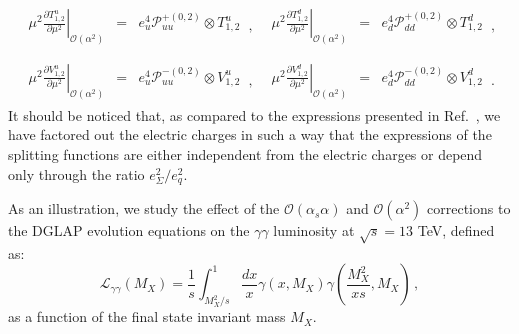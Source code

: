 \begin{equation}
\begin{array}{ll}
\begin{array}{rcl}
\displaystyle \left.\mu^2\frac{\partial T^u_{1,2}}{\partial \mu^2}\right|_{\mathcal{O}(\alpha^2)} &=&
\displaystyle e_u^4\mathcal{P}_{uu}^{+(0,2)}\otimes T^u_{1,2}
\end{array}\,, &
\begin{array}{rcl}
\displaystyle \left.\mu^2\frac{\partial T^d_{1,2}}{\partial \mu^2}\right|_{\mathcal{O}(\alpha^2)} &=&
\displaystyle e_d^4\mathcal{P}_{dd}^{+(0,2)} \otimes T^d_{1,2}
\end{array}\,,
\\
\\
\begin{array}{rcl}
\displaystyle \left.\mu^2\frac{\partial V^u_{1,2}}{\partial \mu^2}\right|_{\mathcal{O}(\alpha^2)} &=&
\displaystyle e_u^4\mathcal{P}_{uu}^{-(0,2)} \otimes V^u_{1,2}
\end{array}\,, &
\begin{array}{rcl}
\displaystyle \left.\mu^2\frac{\partial V^d_{1,2}}{\partial \mu^2}\right|_{\mathcal{O}(\alpha^2)} &=&
\displaystyle e_d^4\mathcal{P}_{dd}^{-(0,2)}\otimes V^d_{1,2}
\end{array}\,.
\end{array}
\end{equation}
It should be noticed that, as compared to the expressions presented in
Ref.~\cite{deFlorian:2016gvk}, we have factored out the electric
charges in such a way that the expressions of the splitting
functions are either independent from the electric charges or depend
only through the ratio $e_\Sigma^2/e_q^2$.

As an illustration, we study the effect of the
$\mathcal{O}(\alpha_s\alpha)$ and $\mathcal{O}(\alpha^2)$ corrections
to the DGLAP evolution equations on the $\gamma\gamma$ luminosity at
$\sqrt{s} = 13$ TeV, defined as:
\begin{equation}\label{eq:GammaGammaLumi}
\mathcal{L}_{\gamma\gamma}(M_X) = \frac1{s}\int_{M_X^2/s}^1
\frac{dx}{x} \gamma(x,M_X) \gamma\left(\frac{M_X^2}{xs},M_X\right)\,,
\end{equation}
as a function of the final state invariant mass $M_X$.

